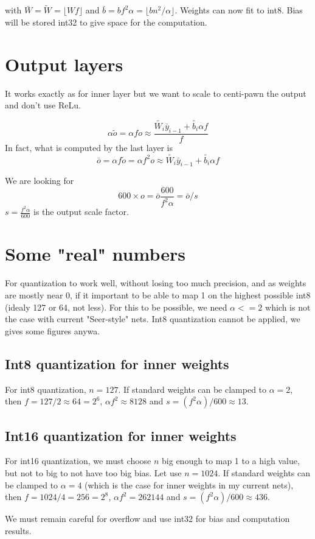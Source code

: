 \documentclass{article}
\begin{document}
with $\bar{W} = \tilde{W} = \lfloor Wf \rfloor$ and $\bar{b} = bf^2\alpha = \lfloor b n^2/\alpha \rfloor$.  Weights can now fit to int8. Bias will be stored int32 to give space for the computation.

\section{Output layers}

It works exactly as for inner layer but we want to scale to centi-pawn the output and don't use ReLu.

$$\alpha \tilde{o} = \alpha f o \approx \frac{\tilde{W_i} \bar{y}_{i-1} + \tilde{b_i}\alpha f}{f}$$
In fact, what is computed by the last layer is
$$\bar{o} = \alpha f \tilde{o} = \alpha f^2 o \approx\tilde{W_i} \bar{y}_{i-1} + \tilde{b_i}\alpha f$$

We are looking for 
$$600\times o = \bar{o} \frac{600}{f^2\alpha} = \bar{o}/s$$
$s = \frac{f^2\alpha}{600}$ is the output scale factor.

\section{Some "real" numbers}

For quantization to work well, without losing too much precision, and as weights are mostly near 0, if it important to be able to map 1 on the highest possible int8 (idealy 127 or 64, not less). For this to be possible, we need $\alpha <=2$ which is not the case with current "Seer-style" nets. Int8 quantization cannot be applied, we gives some figures anywa.

\subsection{Int8 quantization for inner weights}
For int8 quantization, $n=127$. If standard weights can be clamped to $\alpha = 2$, then $f = 127/2 \approx 64 = 2^6$, $\alpha f^2 \approx 8128$ and $s = (f^2\alpha)/600 \approx 13$.

\subsection{Int16 quantization for inner weights}
For int16 quantization, we must choose $n$ big enough to map 1 to a high value, but not to big to not have too big bias. Let use $n=1024$. If standard weights can be clamped to $\alpha = 4$ (which is the case for inner weights in my current nets), then $f = 1024/4 = 256 = 2^8$, $\alpha f^2 = 262144$ and $s = (f^2\alpha)/600 \approx 436$.

We must remain careful for overflow and use int32 for bias and computation results.
\end{document}
